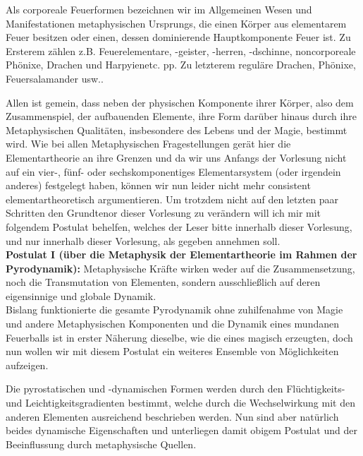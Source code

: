 \documentclass[a5paper,8pt]{book}
\begin{document}
Als corporeale Feuerformen bezeichnen wir im Allgemeinen Wesen und Manifestationen metaphysischen Ursprungs, die einen 
Körper aus elementarem Feuer besitzen oder einen, dessen dominierende Hauptkomponente Feuer ist. Zu Ersterem zählen z.B. 
Feuerelementare, -geister, -herren, -dschinne, noncorporeale Phönixe, Drachen und Harpyien\footnotemark[5] etc. pp. Zu letzterem reguläre 
Drachen, Phönixe, Feuersalamander usw..\\



Allen ist gemein, dass neben der physischen Komponente ihrer Körper, also dem Zusammenspiel, der aufbauenden Elemente, 
ihre Form darüber hinaus durch ihre Metaphysischen Qualitäten, insbesondere des Lebens und der Magie, bestimmt wird.
Wie bei allen Metaphysischen Fragestellungen gerät hier die Elementartheorie an ihre Grenzen und da wir uns Anfangs der 
Vorlesung nicht auf ein vier-, fünf- oder sechskomponentiges Elementarsystem (oder irgendein anderes) festgelegt haben, 
können wir nun leider nicht mehr consistent elementartheoretisch argumentieren.
Um trotzdem nicht auf den letzten paar Schritten den Grundtenor dieser Vorlesung zu verändern will ich mir mit folgendem 
Postulat behelfen, welches der Leser bitte innerhalb dieser Vorlesung, und nur innerhalb dieser Vorlesung, als gegeben 
annehmen soll.\\

\textbf{Postulat I (über die Metaphysik der Elementartheorie im Rahmen der Pyrodynamik):}
Metaphysische Kräfte wirken weder auf die Zusammensetzung, noch die Transmutation von Elementen, sondern ausschließlich 
auf deren eigensinnige und globale Dynamik.\\

Bislang funktionierte die gesamte Pyrodynamik ohne zuhilfenahme von Magie und andere Metaphysischen Komponenten und die 
Dynamik eines mundanen Feuerballs ist in erster Näherung dieselbe, wie die eines magisch erzeugten, doch nun wollen wir 
mit diesem Postulat ein weiteres Ensemble von Möglichkeiten aufzeigen.

Die pyrostatischen und -dynamischen Formen werden durch den Flüchtigkeits- und Leichtigkeitsgradienten bestimmt, welche 
durch die Wechselwirkung mit den anderen Elementen ausreichend beschrieben werden. Nun sind aber natürlich beides 
dynamische Eigenschaften und unterliegen damit obigem Postulat und der Beeinflussung durch metaphysische Quellen.
\end{document}
